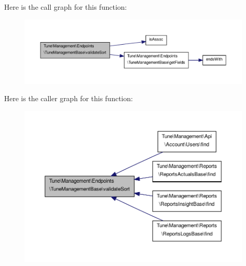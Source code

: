 Here is the call graph for this function\-:
\nopagebreak
\begin{figure}[H]
\begin{center}
\leavevmode
\includegraphics[width=350pt]{classTune_1_1Management_1_1Endpoints_1_1TuneManagementBase_aa81ef05c1abaf189a0fedb49af9df1bd_cgraph}
\end{center}
\end{figure}




Here is the caller graph for this function\-:
\nopagebreak
\begin{figure}[H]
\begin{center}
\leavevmode
\includegraphics[width=350pt]{classTune_1_1Management_1_1Endpoints_1_1TuneManagementBase_aa81ef05c1abaf189a0fedb49af9df1bd_icgraph}
\end{center}
\end{figure}




